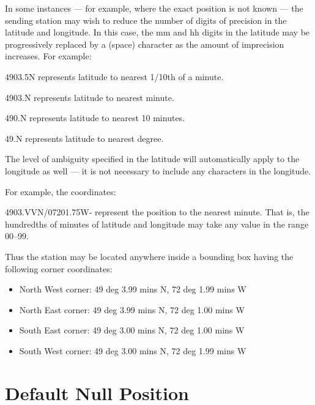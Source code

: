 
In some instances — for example, where the exact position is not known —
the sending station may wish to reduce the number of digits of precision in
the latitude and longitude. In this case, the mm and hh digits in the latitude
may be progressively replaced by a \textvisiblespace (space) character as the amount of
imprecision increases. For example:

\begin{description}
 
\item 4903.5\textvisiblespace N represents latitude to nearest 1/10th of a minute.
\item 4903.\textvisiblespace\textvisiblespace N represents latitude to nearest minute.
\item 490\textvisiblespace.\textvisiblespace\textvisiblespace N represents latitude to nearest 10 minutes.
\item 49\textvisiblespace\textvisiblespace.\textvisiblespace\textvisiblespace N represents latitude to nearest degree.
\end{description}

The level of ambiguity specified in the latitude will automatically apply to
the longitude as well — it is not necessary to include any \textvisiblespace characters in the
longitude.

For example, the coordinates:

4903.VVN/07201.75W- represent the position to the nearest minute. That
is, the hundredths of minutes of latitude and longitude may take any
value in the range 00–99.

Thus the station may be located anywhere inside a bounding box having the
following corner coordinates:

\begin{itemize}

\item North West corner: 49 deg 3.99 mins N, 72 deg 1.99 mins W
\item North East corner: 49 deg 3.99 mins N, 72 deg 1.00 mins W
\item South East corner: 49 deg 3.00 mins N, 72 deg 1.00 mins W
\item South West corner: 49 deg 3.00 mins N, 72 deg 1.99 mins W

\end{itemize}

\section{Default Null Position}

